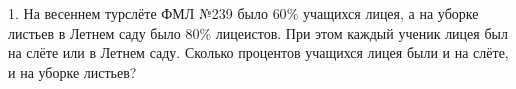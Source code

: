 1. На весеннем турслёте ФМЛ №239 было $60\%$ учащихся лицея, а на уборке листьев в Летнем саду было $80\%$ лицеистов. При этом каждый ученик лицея был на слёте или в Летнем саду. Сколько процентов учащихся лицея были и на слёте, и на уборке листьев?\\
